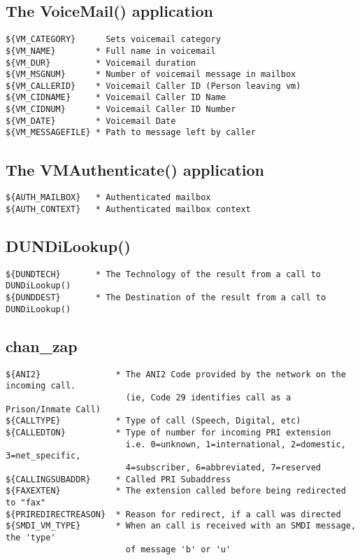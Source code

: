 \subsection{The VoiceMail() application}
\begin{verbatim}
${VM_CATEGORY}      Sets voicemail category
${VM_NAME}        * Full name in voicemail
${VM_DUR}         * Voicemail duration
${VM_MSGNUM}      * Number of voicemail message in mailbox
${VM_CALLERID}    * Voicemail Caller ID (Person leaving vm)
${VM_CIDNAME}     * Voicemail Caller ID Name
${VM_CIDNUM}      * Voicemail Caller ID Number
${VM_DATE}        * Voicemail Date
${VM_MESSAGEFILE} * Path to message left by caller
\end{verbatim}

\subsection{The VMAuthenticate() application}
\begin{verbatim}
${AUTH_MAILBOX}   * Authenticated mailbox
${AUTH_CONTEXT}   * Authenticated mailbox context
\end{verbatim}

\subsection{DUNDiLookup()}
\begin{verbatim}
${DUNDTECH}       * The Technology of the result from a call to DUNDiLookup()
${DUNDDEST}       * The Destination of the result from a call to DUNDiLookup()
\end{verbatim}

\subsection{chan\_zap}
\begin{verbatim}
${ANI2}               * The ANI2 Code provided by the network on the incoming call.
                        (ie, Code 29 identifies call as a Prison/Inmate Call)
${CALLTYPE}           * Type of call (Speech, Digital, etc)
${CALLEDTON}          * Type of number for incoming PRI extension
                        i.e. 0=unknown, 1=international, 2=domestic, 3=net_specific,
                        4=subscriber, 6=abbreviated, 7=reserved
${CALLINGSUBADDR}     * Called PRI Subaddress
${FAXEXTEN}           * The extension called before being redirected to "fax"
${PRIREDIRECTREASON}  * Reason for redirect, if a call was directed
${SMDI_VM_TYPE}       * When an call is received with an SMDI message, the 'type'
                        of message 'b' or 'u'
\end{verbatim}


